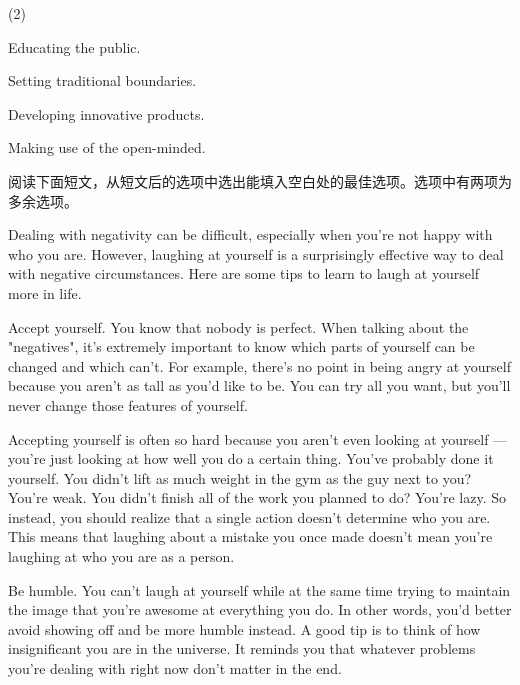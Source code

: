 \documentclass{英语试卷}
\begin{document}
\begin{choices}(2)
  \item Educating the public.
  \item Setting traditional boundaries.
  \item Developing innovative products.
  \item Making use of the open-minded.
\end{choices}
\par 阅读下面短文，从短文后的选项中选出能填入空白处的最佳选项。选项中有两项为多余选项。\par
\par Dealing with negativity can be difficult, especially when you're not happy with who you are.  However, laughing at yourself is a surprisingly effective way to deal with negative circumstances. Here are some tips to learn to laugh at yourself more in life.\par
\par Accept yourself. You know that nobody is perfect.  When talking about the "negatives", it's extremely important to know which parts of yourself can be changed and which can't. For example, there's no point in being angry at yourself because you aren't as tall as you'd like to be. You can try all you want, but you'll never change those features of yourself.\par
\par {} Accepting yourself is often so hard because you aren't even looking at yourself — you're just looking at how well you do a certain thing. You've probably done it yourself. You didn't lift as much weight in the gym as the guy next to you? You're weak. You didn't finish all of the work you planned to do? You're lazy.  So instead, you should realize that a single action doesn't determine who you are. This means that laughing about a mistake you once made doesn't mean you're laughing at who you are as a person.\par
\par Be humble. You can't laugh at yourself while at the same time trying to maintain the image that you're awesome at everything you do. In other words, you'd better avoid showing off and be more humble instead. A good tip is to think of how insignificant you are in the universe.  It reminds you that whatever problems you're dealing with right now don't matter in the end.\par
\end{document}
